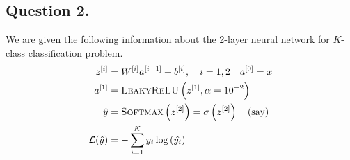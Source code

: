 \documentclass[10pt]{article}
\begin{document}
    \subsection*{\textbf{Question 2.}}
    We are given the following information about the 2-layer neural network for
    $K$-class classification problem.
    \begin{align*}
        z^{[i]} &= W^{[i]} a^{[i-1]} + b^{[i]}, \quad i = 1, 2 \quad a^{[0]} = x \\
        a^{[1]} &= \textsc{LeakyReLU}\left( z^{[1]}, \alpha=10^{-2} \right) \\
        \hat{y} &= \textsc{Softmax}\left( z^{[2]} \right) = \sigma\left( z^{[2]} \right) \quad \text{(say)} \\
        \mathcal{L}(\hat{y}) &= - \sum_{i=1}^{K} y_{i} \log{(\hat{y_{i}})}
    \end{align*}
\end{document}
